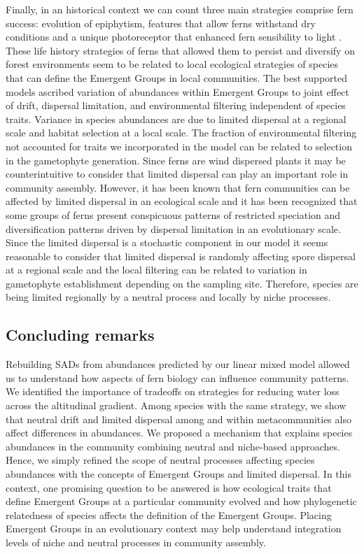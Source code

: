 \documentclass[12pt]{article}
\begin{document}
Finally, in an historical context we can count three main strategies comprise
fern success: evolution of epiphytism, features that allow ferns
withstand dry conditions and a unique photoreceptor that enhanced fern
sensibility to light \citep{Schneider2004, Schuettpelz2009}. These life
history strategies of ferns that allowed them to persist and 
diversify on forest environments seem to be related to local ecological
strategies of species that can define the Emergent Groups in local
communities. 
The best supported models ascribed variation of abundances within
Emergent Groups to joint effect of drift, dispersal limitation, and environmental filtering independent of species traits.
Variance in species abundances are due to limited dispersal at a regional scale and habitat selection at a local scale. The fraction of environmental filtering not accounted for traits we incorporated in the model can be related to selection in the gametophyte generation.  
Since ferns are wind
dispersed plants it may be counterintuitive to consider that limited
dispersal can play an important role in community assembly. However,
it has been known that fern communities can be affected by limited dispersal \citep{Tuomisto2003c, Karst2005, Jones2006} in an ecological scale and 
it has been recognized that some groups of ferns present conspicuous
patterns of restricted speciation and diversification patterns driven
by dispersal limitation \citep{Korall2014, Labiak2014, Sundue2014} in an evolutionary scale. Since the limited dispersal is a stochastic component
in our model it seems reasonable to consider that limited dispersal is
randomly affecting spore dispersal at a regional scale and the local filtering can be related to variation in gametophyte establishment depending on the sampling site. Therefore, species are being limited regionally by a neutral process and locally by niche processes. 


\subsection*{Concluding remarks}

Rebuilding SADs from abundances predicted by our linear mixed model  
allowed us to understand how aspects of fern biology can influence community
patterns. We
identified the importance of tradeoffs on strategies for reducing
water loss across the altitudinal gradient. Among species with the
same strategy, we show that
neutral drift and limited dispersal among and within metacommunities also affect differences in
abundances.  
We proposed a mechanism that explains species
abundances in the community
combining neutral and niche-based
approaches. Hence, we simply refined the scope of neutral processes
affecting species abundances with the concepts of Emergent Groups and
limited dispersal. 
In this context, one promising question to be answered is
how ecological traits that define Emergent Groups at a particular community
evolved and how phylogenetic relatedness of species affects the
definition of the Emergent Groups. Placing Emergent Groups in an
evolutionary context may help understand integration levels of niche
and neutral processes in community assembly.
\end{document}
